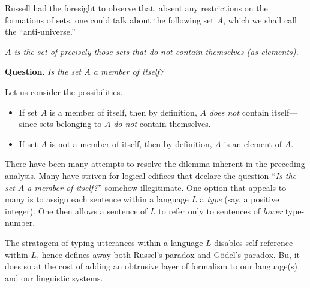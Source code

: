 Russell had the foresight to observe that, absent any restrictions on
the formations of sets, one could talk about the following set $A$,
which we shall call the ``anti-universe.''

\smallskip

{\em $A$ is the set of precisely those sets that {\em do not} contain themselves
  (as elements).}

\smallskip

\noindent
{\bf Question}.  {\it Is the set $A$ a member of itself?}

\noindent
Let us consider the possibilities.
\begin{itemize}
\item
If set $A$ is a member of itself, then by definition, $A$ {\em does
  not} contain itself---since sets belonging to $A$ {\em do not}
contain themselves.

\item
If set $A$ is not a member of itself, then by definition, $A$ is an
element of $A$.
\end{itemize}

There have been many attempts to resolve the dilemma inherent in the
preceding analysis.  Many have striven for logical edifices that
declare the question ``{\it Is the set $A$ a member of itself?}''
somehow illegitimate.  One option that appeals to many is to assign
each sentence within a language $L$ a {\it type}
(say, a positive integer).  One then allows a sentence of $L$ to refer only to
sentences of {\em lower} type-number.

The stratagem of typing utterances within a language $L$ disables
self-reference within $L$, hence defines away both Russel's paradox
and G\"{o}del's paradox. Bu, it does so at the cost of adding an obtrusive layer of formalism to
our language(s) and our linguistic systems.



